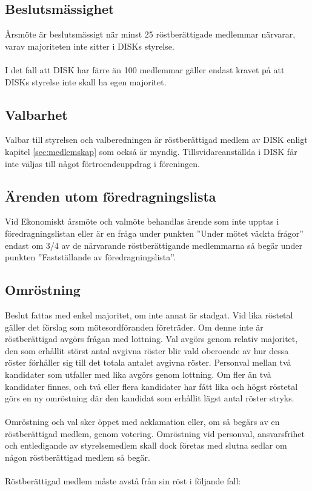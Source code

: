         \subsection{Beslutsmässighet}
        \label{subsec:beslutsmassighet}
                Årsmöte är beslutsmässigt när minst 25 röstberättigade medlemmar närvarar, varav majoriteten inte sitter i DISKs styrelse.\\ \\
                I det fall att DISK har färre än 100 medlemmar gäller endast kravet på att DISKs styrelse inte skall ha egen majoritet.

        \subsection{Valbarhet}
        \label{subsec:valbarhet}
                Valbar till styrelsen och valberedningen är röstberättigad medlem av DISK enligt kapitel \ref{sec:medlemskap} som också är myndig. Tillsvidareanställda i DISK får inte väljas till något förtroendeuppdrag i föreningen.

        \subsection{Ärenden utom föredragningslista}
        \label{subsec:arendenutomforedragningslista}
                Vid Ekonomiskt årsmöte och valmöte behandlas ärende som inte upptas i föredragningslistan eller är en fråga under punkten ”Under mötet väckta frågor” endast om 3/4 av de närvarande röstberättigande medlemmarna så begär under punkten ”Fastställande av föredragningslista”.

        \subsection{Omröstning}
        \label{subsec:omrostning}
                Beslut fattas med enkel majoritet, om inte annat är stadgat. Vid lika röstetal gäller det förslag som mötesordföranden företräder. Om denne inte är röstberättigad avgörs frågan med lott\-ning. Val avgörs genom relativ majoritet, den som erhållit störst antal avgivna röster blir vald oberoende av hur dessa röster förhåller sig till det totala antalet avgivna röster. Personval mellan två kandidater som utfaller med lika avgörs genom lottning. Om fler än två kandidater finnes, och två eller flera kandidater har fått lika och högst röstetal görs en ny omröstning där den kandidat som erhållit lägst antal röster stryks.\\ \\
                Omröstning och val sker öppet med acklamation eller, om så begärs av en röstberättigad medlem, genom votering. Omröstning vid personval, ansvarsfrihet och entledigande av styrelse\-medlem skall dock företas med slutna sedlar om någon röstberättigad medlem så begär.\\ \\
Röstberättigad medlem måste avstå från sin röst i följande fall:

